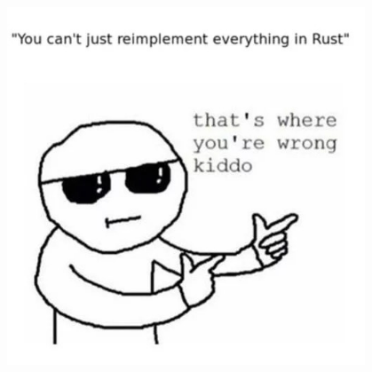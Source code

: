 \documentclass{article}
\begin{document}
\section*{}
\medskip
\begin{center}
    \includegraphics[width=0.8\textwidth]{img/rust_comic}
\end{center}
\bigskip     %
\bigskip     %
\newpage



\end{document}
